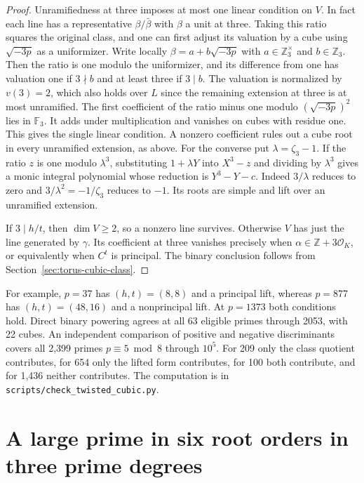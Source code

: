 \documentclass[11pt]{article}
\begin{document}
\begin{proof}
Unramifiedness at three imposes at most one linear condition on
\(V\). In fact each line has a representative \(\beta/\bar\beta\)
with \(\beta\) a unit at three. Taking this ratio squares the
original class, and one can first adjust its valuation by a cube
using \(\sqrt{-3p}\) as a uniformizer. Write locally
\(\beta=a+b\sqrt{-3p}\) with \(a\in\mathbb Z_3^\times\) and
\(b\in\mathbb Z_3\). Then the ratio is one modulo the uniformizer,
and its difference from one has valuation one if \(3\nmid b\) and
at least three if \(3\mid b\). The valuation is normalized by
\(v(3)=2\), which also holds over \(L\) since the remaining extension
at three is at most unramified. The first coefficient of the
ratio minus one modulo \((\sqrt{-3p})^2\) lies in \(\mathbb F_3\).
It adds under multiplication and vanishes on cubes with residue
one. This gives the single linear condition. A nonzero coefficient
rules out a cube root in every unramified extension, as above.
For the converse put \(\lambda=\zeta_3-1\). If the ratio \(z\) is
one modulo \(\lambda^3\), substituting \(1+\lambda Y\) into
\(X^3-z\) and dividing by \(\lambda^3\) gives a monic integral
polynomial whose reduction is \(Y^3-Y-c\). Indeed \(3/\lambda\)
reduces to zero and \(3/\lambda^2=-1/\zeta_3\) reduces to \(-1\).
Its roots are simple and lift over an unramified extension.

If \(3\mid h/t\), then \(\dim V\ge2\), so a nonzero line survives.
Otherwise \(V\) has just the line generated by \(\gamma\). Its
coefficient at three vanishes precisely when
\(\alpha\in\mathbb Z+3\mathcal O_K\), or equivalently when \(C^t\)
is principal. The binary conclusion follows from
Section~\ref{sec:torus-cubic-class}.
\end{proof}

For example, \(p=37\) has \((h,t)=(8,8)\) and a principal lift,
whereas \(p=877\) has \((h,t)=(48,16)\) and a nonprincipal lift.
At \(p=1373\) both conditions hold. Direct binary powering agrees at
all 63 eligible primes through 2053, with 22 cubes. An independent
comparison of positive and negative discriminants covers all 2,399
primes \(p\equiv5\bmod8\) through \(10^5\). For 209 only the
class quotient contributes, for 654 only the lifted form contributes,
for 100 both contribute, and for 1,436 neither contributes. The
computation is in \nolinkurl{scripts/check_twisted_cubic.py}.

\clearpage
\section{A large prime in six root orders in three prime degrees}
\label{sec:cyclotomic-weight-spectra}
\end{document}

